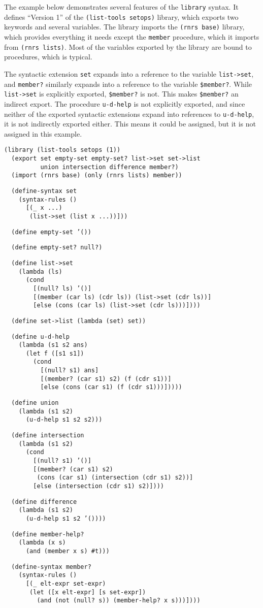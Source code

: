 The example below demonstrates several features of the \texttt{library} syntax.
It defines ``Version 1'' of the \texttt{(list-tools setops)} library, which
exports two keywords and several variables.
The library imports the \texttt{(rnrs base)} library, which provides
everything it needs except the \texttt{member} procedure, which it imports
from \texttt{(rnrs lists)}.
Most of the variables exported by the library are bound to procedures,
which is typical.


The syntactic extension \texttt{set} expands into a reference to the variable
\texttt{list-\textgreater{}set}, and \texttt{member?} similarly expands into a reference
to the variable \texttt{\${}member?}.
While \texttt{list-\textgreater{}set} is explicitly exported, \texttt{\${}member?} is not.
This makes \texttt{\${}member?} an indirect export.
The procedure \texttt{u-d-help} is not explicitly exported, and
since neither of the exported syntactic extensions expand into references
to \texttt{u-d-help}, it is not indirectly exported either.
This means it could be assigned, but it is not assigned in this example.


\begin{alltt}
(library (list-tools setops (1))
  (export set empty-set empty-set? list-\textgreater{}set set-\textgreater{}list
          union intersection difference member?)
  (import (rnrs base) (only (rnrs lists) member))

  (define-syntax set
    (syntax-rules ()
      [(\_{} x ...)
       (list-\textgreater{}set (list x ...))]))

  (define empty-set '())

  (define empty-set? null?)

  (define list-\textgreater{}set
    (lambda (ls)
      (cond
        [(null? ls) '()]
        [(member (car ls) (cdr ls)) (list-\textgreater{}set (cdr ls))]
        [else (cons (car ls) (list-\textgreater{}set (cdr ls)))])))

  (define set-\textgreater{}list (lambda (set) set))

  (define u-d-help
    (lambda (s1 s2 ans)
      (let f ([s1 s1])
        (cond
          [(null? s1) ans]
          [(member? (car s1) s2) (f (cdr s1))]
          [else (cons (car s1) (f (cdr s1)))]))))

  (define union
    (lambda (s1 s2)
      (u-d-help s1 s2 s2)))

  (define intersection
    (lambda (s1 s2)
      (cond
        [(null? s1) '()]
        [(member? (car s1) s2)
         (cons (car s1) (intersection (cdr s1) s2))]
        [else (intersection (cdr s1) s2)])))

  (define difference
    (lambda (s1 s2)
      (u-d-help s1 s2 '())))

  (define member-help?
    (lambda (x s)
      (and (member x s) \#{}t)))

  (define-syntax member?
    (syntax-rules ()
      [(\_{} elt-expr set-expr)
       (let ([x elt-expr] [s set-expr])
         (and (not (null? s)) (member-help? x s)))])))
\end{alltt}


